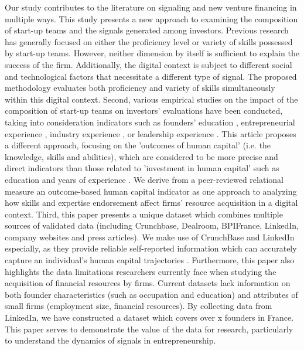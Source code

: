 \documentclass[12pt]{article}
\begin{document}
Our study contributes to the literature on signaling and new venture financing in multiple ways. This study presents a new approach to examining the composition of start-up teams and the signals generated among investors. Previous research has generally focused on either the proficiency level or variety of skills possessed by start-up teams. However, neither dimension by itself is sufficient to explain the success of the firm. Additionally, the digital context is subject to different social and technological factors that necessitate a different type of signal. The proposed methodology evaluates both proficiency and variety of skills simultaneously within this digital context. Second, various empirical studies on the impact of the composition of start-up teams on investors' evaluations have been conducted, taking into consideration indicators such as founders' education \citep{franke2008venture}, entrepreneurial experience \citep{beckman2007early}, industry experience \citep{becker2015new}, or leadership experience \citep{hoenig2015quality}. This article proposes a different approach, focusing on the 'outcomes of human capital' (i.e. the knowledge, skills and abilities), which are considered to be more precise and direct indicators than those related to 'investment in human capital' such as education and years of experience \citep{unger2011human, marvel2016human}. We derive from a peer-reviewed relational measure an outcome-based human capital indicator as one approach to analyzing how skills and expertise endorsement affect firms' resource acquisition in a digital context. Third, this paper presents a unique dataset which combines multiple sources of validated data (including Crunchbase, Dealroom, BPIFrance, LinkedIn, company websites and press articles). We make use of CrunchBase and LinkedIn especially, as they provide reliable self-reported information which can accurately capture an individual's human capital trajectories \citep{sako2020scaling, rapanta2017linkedin, reese2020should}. Furthermore, this paper also highlights the data limitations researchers currently face when studying the acquisition of financial resources by firms. Current datasets lack information on both founder characteristics (such as occupation and education) and attributes of small firms (employment size, financial resources). By collecting data from LinkedIn, we have constructed a dataset which covers over x founders in France. This paper serves to demonstrate the value of the data for research, particularly to understand the dynamics of signals in entrepreneurship.
\end{document}
